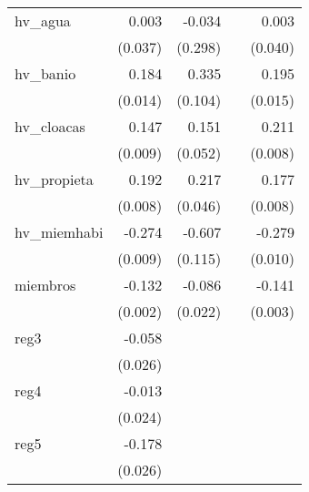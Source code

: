 {\begin{longtable}{l*{4}{D{.}{.}{-1}}}
\addlinespace
hv\_agua     &       0.003         &      -0.034         &                     &       0.003         \\
            &     (0.037)         &     (0.298)         &                     &     (0.040)         \\
\addlinespace
hv\_banio    &       0.184\sym{***}&       0.335\sym{**} &                     &       0.195\sym{***}\\
            &     (0.014)         &     (0.104)         &                     &     (0.015)         \\
\addlinespace
hv\_cloacas  &       0.147\sym{***}&       0.151\sym{**} &                     &       0.211\sym{***}\\
            &     (0.009)         &     (0.052)         &                     &     (0.008)         \\
\addlinespace
hv\_propieta &       0.192\sym{***}&       0.217\sym{***}&                     &       0.177\sym{***}\\
            &     (0.008)         &     (0.046)         &                     &     (0.008)         \\
\addlinespace
hv\_miemhabi &      -0.274\sym{***}&      -0.607\sym{***}&                     &      -0.279\sym{***}\\
            &     (0.009)         &     (0.115)         &                     &     (0.010)         \\
\addlinespace
miembros    &      -0.132\sym{***}&      -0.086\sym{***}&                     &      -0.141\sym{***}\\
            &     (0.002)         &     (0.022)         &                     &     (0.003)         \\
\addlinespace
reg3        &      -0.058\sym{*}  &                     &                     &                     \\
            &     (0.026)         &                     &                     &                     \\
\addlinespace
reg4        &      -0.013         &                     &                     &                     \\
            &     (0.024)         &                     &                     &                     \\
\addlinespace
reg5        &      -0.178\sym{***}&                     &                     &                     \\
            &     (0.026)         &                     &                     &                     \\

\end{longtable}}
